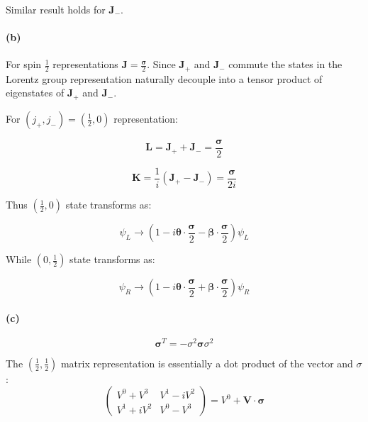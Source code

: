 \documentclass[11pt]{article}
\begin{document}
Similar result holds for $\mathbf{J}_-$.

\pagebreak

\paragraph*{(b)} For spin $\frac{1}{2}$ representations
$\mathbf{J} = \frac{\boldsymbol{\sigma}}{2}$. Since $\mathbf{J}_+$ and
$\mathbf{J}_-$ commute the states in the Lorentz group representation
naturally decouple into a tensor product of eigenstates of
$\mathbf{J}_+$ and $\mathbf{J}_-$.

For $(j_+, j_-) = (\frac{1}{2}, 0)$ representation:

\begin{equation}
\mathbf{L} = \mathbf{J}_+ + \mathbf{J}_- =
  \frac{\boldsymbol{\sigma}}{2}
\end{equation}

\begin{equation}
\mathbf{K} = \frac{1}{i} \left( \mathbf{J}_+ - \mathbf{J}_- \right) =
  \frac{\boldsymbol{\sigma}}{2i}
\end{equation}

Thus $(\frac{1}{2}, 0)$ state transforms as:

\begin{equation}
\psi_L \rightarrow
  \left(
    1 - i \boldsymbol{\theta} \cdot \frac{\boldsymbol{\sigma}}{2} -
    \boldsymbol{\beta} \cdot \frac{\boldsymbol{\sigma}}{2}
  \right) \psi_L
\end{equation}

While $(0, \frac{1}{2})$ state transforms as:

\begin{equation}
\psi_R \rightarrow
  \left(
    1 - i \boldsymbol{\theta} \cdot \frac{\boldsymbol{\sigma}}{2} +
    \boldsymbol{\beta} \cdot \frac{\boldsymbol{\sigma}}{2}
  \right) \psi_R
\end{equation}

\paragraph*{(c)}

\begin{equation}
\boldsymbol{\sigma}^T = - \sigma^2 \boldsymbol{\sigma} \sigma^2
\end{equation}

The $(\frac{1}{2}, \frac{1}{2})$ matrix representation is essentially
a dot product of the vector and $\sigma$:
\begin{equation}
\begin{pmatrix}
V^0 + V^3 & V^1 - i V^2 \\
V^1 + i V^2 & V^0 - V^3
\end{pmatrix} = V^0 + \mathbf{V} \cdot \boldsymbol{\sigma} 
\end{equation}
\end{document}
